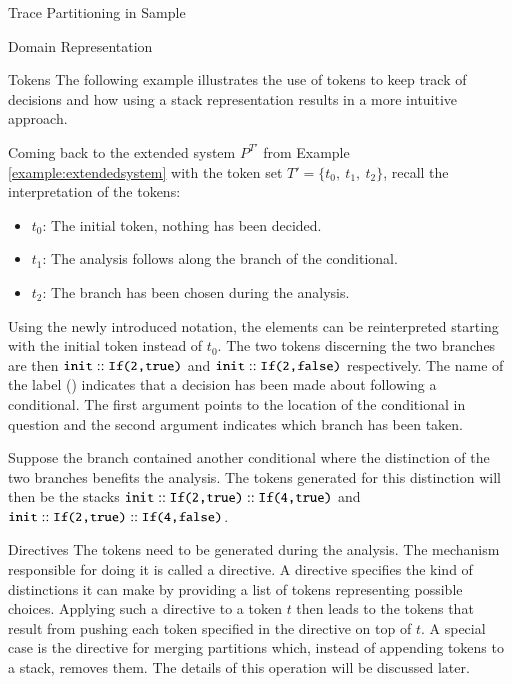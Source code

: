 \begin{chapter}{Trace Partitioning in Sample}
\begin{section}{Domain Representation}
\begin{subsection}{Tokens}
			The following example illustrates the use of tokens to keep track of decisions and how using a stack representation results in a more intuitive approach.

			\begin{example}[Tokens]
				Coming back to the extended system $P^{T'}$ from Example \ref{example:extendedsystem} with the token set $T' = \{t_0,\ t_1,\ t_2\}$, recall the interpretation of the tokens:
				\begin{itemize}
					\item $t_0$: The initial token, nothing has been decided.
					\item $t_1$: The analysis follows along the  branch of the conditional.
					\item $t_2$: The  branch has been chosen during the analysis.
				\end{itemize}
				Using the newly introduced notation, the elements can be reinterpreted starting with the initial token  instead of $t_0$. The two tokens discerning the two branches are then $\texttt{init}::\texttt{If(2,true)}$ and $\texttt{init}::\texttt{If(2,false)}$ respectively. The name of the label () indicates that a decision has been made about following a conditional. The first argument points to the location of the conditional in question and the second argument indicates which branch has been taken.

				Suppose the  branch contained another conditional where the distinction of the two branches benefits the analysis. The tokens generated for this distinction will then be the stacks $\texttt{init}::\texttt{If(2,true)}::\texttt{If(4,true)}$ and $\texttt{init}::\texttt{If(2,true)}::\texttt{If(4,false)}$.
				\exampleend
			\end{example}
		\end{subsection}


		\begin{subsection}{Directives}
			The tokens need to be generated during the analysis. The mechanism responsible for doing it is called a directive. A directive specifies the kind of distinctions it can make by providing a list of tokens representing possible choices. Applying such a directive to a token $t$ then leads to the tokens that result from pushing each token specified in the directive on top of $t$. A special case is the directive for merging partitions which, instead of appending tokens to a stack, removes them. The details of this operation will be discussed later.


\end{subsection}
\end{section}
\end{chapter}
